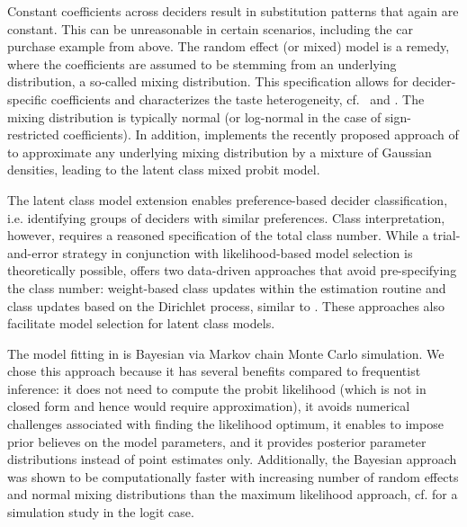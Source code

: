 \documentclass[article,shortnames]{jss}
\begin{document}
Constant coefficients across deciders result in substitution patterns that again are constant. This can be unreasonable in certain scenarios, including the car purchase example from above. The random effect (or mixed) model is a remedy, where the coefficients are assumed to be stemming from an underlying distribution, a so-called mixing distribution. This specification allows for decider-specific coefficients and characterizes the taste heterogeneity, cf.\ \cite{Train:2009} and \cite{Bhat:2011}. The mixing distribution is typically normal (or log-normal in the case of sign-restricted coefficients). In addition,  implements the recently proposed approach of \cite{Oelschlaeger:2020} to approximate any underlying mixing distribution by a mixture of Gaussian densities, leading to the latent class mixed probit model.

The latent class model extension enables preference-based decider classification, i.e. identifying groups of deciders with similar preferences. Class interpretation, however, requires a reasoned specification of the total class number. While a trial-and-error strategy in conjunction with likelihood-based model selection is theoretically possible,  offers two data-driven approaches that avoid pre-specifying the class number: weight-based class updates within the estimation routine \citep{Oelschlaeger:2020} and class updates based on the Dirichlet process, similar to \cite{Burda:2008}. These approaches also facilitate model selection for latent class models.

The model fitting in  is Bayesian via Markov chain Monte Carlo simulation. We chose this approach because it has several benefits compared to frequentist inference: it does not need to compute the probit likelihood (which is not in closed form and hence would require approximation), it avoids numerical challenges associated with finding the likelihood optimum, it enables to impose prior believes on the model parameters, and it provides posterior parameter distributions instead of point estimates only. Additionally, the Bayesian approach was shown to be computationally faster with increasing number of random effects and normal mixing distributions than the maximum likelihood approach, cf. \cite{Train:2001} for a simulation study in the logit case.
\end{document}
